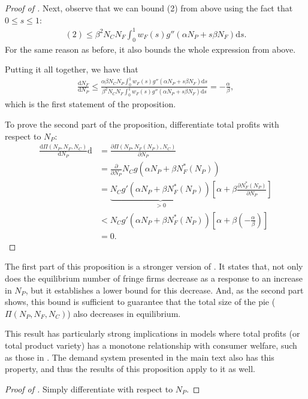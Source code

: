 \documentclass[a4paper]{article}
\newcommand{\dd}{\mathrm{d}}
\newcommand{\ds}{\mathrm{d}s}
\begin{document}
\begin{proof}[Proof of ]
    Next, observe that we can bound (2) from above using the fact that $0 \leq s \leq 1$:
    \begin{align*}
        (2) \leq \beta^2 N_C N_F \int_0^1 w_F(s) g''(\alpha N_P + s \beta N_F) \ds.
    \end{align*}
    For the same reason as before, it also bounds the whole expression from above.

    Putting it all together, we have that
    \begin{align*}
        \frac{\dd N_F}{\dd N_P} \leq \frac{\alpha \beta N_C N_P \int_0^1 w_F(s) g''(\alpha N_P + s \beta N_F) \ds}{\beta^2 N_C N_F \int_0^1 w_F(s) g''(\alpha N_P + s \beta N_F) \ds} = -\frac{\alpha}{\beta},
    \end{align*}
    which is the first statement of the proposition.

    To prove the second part of the proposition, differentiate total profits with respect to $N_P$:
    \begin{align*}
        \frac{\dd \Pi(N_P, N_F, N_C)}{\dd N_P}{\dd} &= \frac{\partial \Pi(N_P, N_F(N_P), N_C)}{\partial N_P} \\
         &= \frac{\partial}{\partial N_P} N_C g(\alpha N_P + \beta N_F^*(N_P)) \\
        &= \underbrace{N_C g'(\alpha N_P + \beta N_F^*(N_P))}_{> 0} \left[ \alpha + \beta \frac{\partial N_F^*(N_P)}{\partial N_P} \right] \\
        &< N_C g'(\alpha N_P + \beta N_F^*(N_P)) \left[ \alpha + \beta \left( -\frac{\alpha}{\beta} \right) \right] \\
        &= 0.
    \end{align*}
\end{proof}

The first part of this proposition is a stronger version of .
It states that, not only does the equilibrium number of fringe firms decrease as a response to an increase in $N_P$, but it establishes a lower bound for this decrease.
And, as the second part shows, this bound is sufficient to guarantee that the total size of the pie ($\Pi(N_P, N_F, N_C)$) also decreases in equilibrium.

This result has particularly strong implications in models where total profits (or total product variety) has a monotone relationship with consumer welfare, such as those in \textcite{anderson2020aggregative}.
The demand system presented in the main text also has this property, and thus the results of this proposition apply to it as well.
\begin{proof}[Proof of ]
    Simply differentiate  with respect to $N_P$.
\end{proof}
\end{document}
